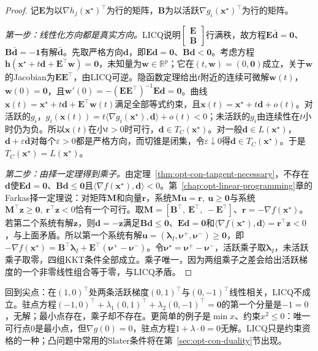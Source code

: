 \begin{proof}
记$\bm E$为以$\nabla h_j(\bm x^\star)^\top$为行的矩阵，$\bm B$为以活跃$\nabla g_i(\bm x^\star)^\top$为行的矩阵。

\emph{第一步：线性化方向都是真实方向。}LICQ说明$\begin{bmatrix}\bm E\\\bm B\end{bmatrix}$行满秩，故方程$\bm E\bar{\bm d}=\bm0$、$\bm B\bar{\bm d}=-\bm 1$有解$\bar{\bm d}$。先取严格方向$\bm d$，即$\bm E\bm d=\bm0$、$\bm B\bm d<\bm0$。考虑方程$\bm h(\bm x^\star+t\bm d+\bm E^\top\bm w)=\bm0$，未知量为$\bm w\in\mathbb R^p$；它在$(t,\bm w)=(0,\bm0)$成立，关于$\bm w$的Jacobian为$\bm E\bm E^\top$，由LICQ可逆。隐函数定理给出$t$附近的连续可微解$\bm w(t)$，$\bm w(0)=\bm0$，且$\bm w'(0)=-(\bm E\bm E^\top)^{-1}\bm E\bm d=\bm0$。曲线$\bm x(t)=\bm x^\star+t\bm d+\bm E^\top\bm w(t)$满足全部等式约束，且$\bm x(t)=\bm x^\star+t\bm d+o(t)$。对活跃的$g_i$，$g_i(\bm x(t))=t\langle\nabla g_i(\bm x^\star),\bm d\rangle+o(t)<0$；未活跃的$g_i$由连续性在$t$小时仍为负。所以$\bm x(t)$在小$t>0$时可行，$\bm d\in T_C(\bm x^\star)$。对一般$\bm d\in L(\bm x^\star)$，$\bm d+\varepsilon\bar{\bm d}$对每个$\varepsilon>0$都是严格方向，而切锥是闭集，令$\varepsilon\downarrow0$得$\bm d\in T_C(\bm x^\star)$。于是$T_C(\bm x^\star)=L(\bm x^\star)$。

\emph{第二步：由择一定理得到乘子。}由定理~\ref{thm:opt-con-tangent-necessary}，不存在$\bm d$使$\bm E\bm d=\bm0$、$\bm B\bm d\leq\bm0$且$\langle\nabla f(\bm x^\star),\bm d\rangle<0$。第~\ref{chap:opt-linear-programming}章的Farkas择一定理说：对矩阵$\bm M$和向量$\bm r$，系统$\bm M\bm u=\bm r,\ \bm u\geq\bm0$与系统$\bm M^\top\bm z\geq\bm0,\ \bm r^\top\bm z<0$恰有一个可行。取$\bm M=[\bm B^\top,\ \bm E^\top,\ -\bm E^\top]$、$\bm r=-\nabla f(\bm x^\star)$。若第二个系统有解$\bm z$，则$\bm d=-\bm z$满足$\bm B\bm d\leq\bm0$、$\bm E\bm d=\bm0$和$\langle\nabla f(\bm x^\star),\bm d\rangle=\bm r^\top\bm z<0$，与上面矛盾。所以第一个系统有解$\bm u=(\bm\lambda_I,\bm\nu^+,\bm\nu^-)\geq\bm0$，即$-\nabla f(\bm x^\star)=\bm B^\top\bm\lambda_I+\bm E^\top(\bm\nu^+-\bm\nu^-)$。令$\bm\nu^\star=\bm\nu^+-\bm\nu^-$，活跃乘子取$\bm\lambda_I$，未活跃乘子取零，四组KKT条件全部成立。乘子唯一，因为两组乘子之差会给出活跃梯度的一个非零线性组合等于零，与LICQ矛盾。
\end{proof}

回到尖点：在$(1,0)^\top$处两条活跃梯度$(0,1)^\top$与$(0,-1)^\top$线性相关，LICQ不成立。驻点方程$(-1,0)^\top+\lambda_1(0,1)^\top+\lambda_2(0,-1)^\top=\bm0$的第一个分量是$-1=0$，无解；最小点存在，乘子却不存在。更简单的例子是$\min x$、约束$x^2\leq0$：唯一可行点$0$是最小点，但$\nabla g(0)=0$，驻点方程$1+\lambda\cdot0=0$无解。LICQ只是约束资格的一种；凸问题中常用的Slater条件将在第~\ref{sec:opt-con-duality}节出现。

